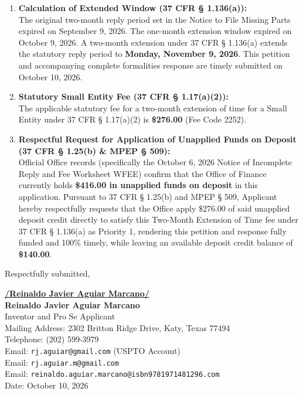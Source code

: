 \documentclass[11pt,letterpaper]{article}
\begin{document}
\begin{enumerate}[leftmargin=*]
    \item \textbf{Calculation of Extended Window (37 CFR \S{} 1.136(a)):} \\
    The original two-month reply period set in the Notice to File Missing Parts expired on September 9, 2026. The one-month extension window expired on October 9, 2026. A two-month extension under 37 CFR \S{} 1.136(a) extends the statutory reply period to \textbf{Monday, November 9, 2026}. This petition and accompanying complete formalities response are timely submitted on October 10, 2026.

    \item \textbf{Statutory Small Entity Fee (37 CFR \S{} 1.17(a)(2)):} \\
    The applicable statutory fee for a two-month extension of time for a Small Entity under 37 CFR \S{} 1.17(a)(2) is \textbf{\$276.00} (Fee Code 2252).

    \item \textbf{Respectful Request for Application of Unapplied Funds on Deposit (37 CFR \S{} 1.25(b) \& MPEP \S{} 509):} \\
    Official Office records (specifically the October 6, 2026 Notice of Incomplete Reply and Fee Worksheet WFEE) confirm that the Office of Finance currently holds \textbf{\$416.00 in unapplied funds on deposit} in this application. Pursuant to 37 CFR \S{} 1.25(b) and MPEP \S{} 509, Applicant hereby respectfully requests that the Office apply \$276.00 of said unapplied deposit credit directly to satisfy this Two-Month Extension of Time fee under 37 CFR \S{} 1.136(a) as Priority 1, rendering this petition and response fully funded and 100\% timely, while leaving an available deposit credit balance of \textbf{\$140.00}.
\end{enumerate}

\vspace{0.6cm}
\begin{singlespace}
\noindent Respectfully submitted, \par\vspace{0.8cm}
\underline{\textbf{/Reinaldo Javier Aguiar Marcano/}} \\
\textbf{Reinaldo Javier Aguiar Marcano} \\
Inventor and Pro Se Applicant \\
Mailing Address: 2302 Britton Ridge Drive, Katy, Texas 77494 \\
Telephone: (202) 599-3979 \\
Email: \texttt{rj.aguiar@gmail.com} (USPTO Account) \\
Email: \texttt{rj.aguiar.m@gmail.com} \\
Email: \texttt{reinaldo.aguiar.marcano@isbn9781971481296.com} \\
Date: October 10, 2026
\end{singlespace}
\end{document}
